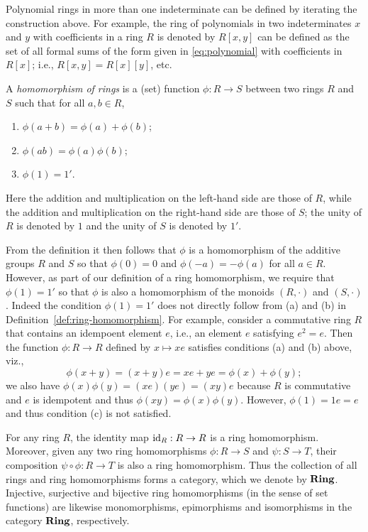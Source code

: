 \begin{example}
    Polynomial rings in more than one indeterminate can be defined by iterating
    the construction above. For example, the ring of polynomials in two
    indeterminates \(x\) and \(y\) with coefficients in a ring \(R\) is denoted
    by \(R[x, y]\) can be defined as the set of all formal sums of the form
    given in \eqref{eq:polynomial} with coefficients in \(R[x]\); i.e., \(R[x,
    y] = R[x][y]\), etc.
\end{example}

\begin{definition}
    \label{def:ring-homomorphism}
    A \emph{homomorphism of rings} is a (set) function \(\phi: R \to S\) between
    two rings \(R\) and \(S\) such that for all \(a, b \in R\),
    \begin{enumerate}[label=(\alph*)]
        \item \(\phi(a + b) = \phi(a) + \phi(b)\);
        \item \(\phi(ab) = \phi(a)\phi(b)\);
        \item \(\phi(1) = 1'\).
    \end{enumerate}
    Here the addition and multiplication on the left-hand side are those of
    \(R\), while the addition and multiplication on the right-hand side are
    those of \(S\); the unity of \(R\) is denoted by \(1\) and the unity of
    \(S\) is denoted by \(1'\).
\end{definition}

From the definition it then follows that \(\phi\) is a homomorphism of the
additive groups \(R\) and \(S\) so that \(\phi(0) = 0\) and \(\phi(-a) =
-\phi(a)\) for all \(a \in R\). However, as part of our definition of a ring
homomorphism, we require that \(\phi(1) = 1'\) so that \(\phi\) is also a
homomorphism of the monoids \((R, \cdot)\) and \((S, \cdot)\). Indeed the
condition \(\phi(1) = 1'\) does not directly follow from (a) and (b) in
Definition~\ref{def:ring-homomorphism}. For example, consider a commutative ring
\(R\) that contains an idempoent element \(e\), i.e., an element \(e\)
satisfying \(e^2 = e\). Then the function \(\phi: R \to R\) defined by \(x
\mapsto xe\) satisfies conditions (a) and (b) above, viz., \[\phi(x + y) = (x +
y)e = xe + ye = \phi(x) + \phi(y);\] we also have \(\phi(x) \phi(y) = (xe)(ye) =
(xy)e\) because \(R\) is commutative and \(e\) is idempotent and thus \(\phi(xy)
= \phi(x) \phi(y)\). However, \(\phi(1) = 1e = e\) and thus condition (c) is not
satisfied.

For any ring \(R\), the identity map \(\operatorname{id}_R: R \to R\) is a ring homomorphism.
Moreover, given any two ring homomorphisms \(\phi: R \to S\) and \(\psi: S \to
T\), their composition \(\psi \circ \phi: R \to T\) is also a ring homomorphism.
Thus the collection of all rings and ring homomorphisms forms a category, which
we denote by \(\mathbf{Ring}\). Injective, surjective and bijective ring homomorphisms
(in the sense of set functions) are likewise monomorphisms, epimorphisms and
isomorphisms in the category \(\mathbf{Ring}\), respectively.

